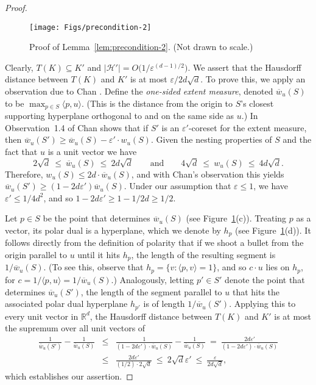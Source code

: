 \documentclass[11pt]{article}   \usepackage[letterpaper,hmargin=2.1cm,vmargin=3cm]{geometry}
\newcommand{\ang}[1]{\langle #1\rangle}
\newcommand{\RE}{\mathbb{R}}    \newcommand{\ZZ}{\mathbb{Z}}    \newcommand{\eps}{\varepsilon}  \newcommand{\ST}{\,:\,}         \newcommand{\sq}{\square}
\newcommand{\inv}[1]{\frac{1}{#1}}
\begin{document}
\begin{proof}
\begin{figure}[htbp]
  \centerline{\texttt{[image: Figs/precondition-2]}}
  \caption{Proof of Lemma~\ref{lem:precondition-2}. (Not drawn to scale.)}
  \label{fig:precondition-2}
\end{figure}


Clearly, $T(K) \subseteq K'$ and $|\mathcal{H'}| = O\big(1/\eps^{(d-1)/2}\big)$. We assert that the Hausdorff distance between $T(K)$ and $K'$ is at most $\eps/2d\sqrt{d}$. To prove this, we apply an observation due to Chan \cite{Chan-coreset}. Define the \emph{one-sided extent measure}, denoted $\overline{w}_u(S)$ to be $\max_{p \in S} \ang{p, u}$. (This is the distance from the origin to $S$'s closest supporting hyperplane orthogonal to and on the same side as $u$.) In Observation~{1.4} of \cite{Chan-coreset} Chan shows that if $S'$ is an $\eps'$-coreset for the extent measure, then $\overline{w}_u(S') \ge \overline{w}_u(S) - \eps' \cdot w_u(S)$. Given the nesting properties of $S$ and the fact that $u$ is a unit vector we have 
\[
	2 \sqrt{d} ~ \le ~ \overline{w}_u(S) ~ \le ~ 2 d \sqrt{d}
		\qquad\mbox{and}\qquad
	4 \sqrt{d} ~ \le ~ w_u(S) ~ \le ~ 4 d \sqrt{d}. 
\]
Therefore, $w_u(S) \le 2 d \cdot \overline{w}_u(S)$, and with Chan's observation this yields $\overline{w}_u(S') \ge (1 - 2 d \eps') \overline{w}_u(S)$. Under our assumption that $\eps \le 1$, we have $\eps' \le 1/4 d^2$, and so $1 - 2 d \eps' \ge 1 - 1/2 d \ge 1/2$.

Let $p \in S$ be the point that determines $\overline{w}_u(S)$ (see Figure~\ref{fig:precondition-2}(c)). Treating $p$ as a vector, its polar dual is a hyperplane, which we denote by $h_p$ (see Figure~\ref{fig:precondition-2}(d)). It follows directly from the definition of polarity that if we shoot a bullet from the origin parallel to $u$ until it hits $h_p$, the length of the resulting segment is $1/\overline{w}_u(S)$. (To see this, observe that $h_p = \{v : \ang{p,v} = 1\}$, and so $c \cdot u$ lies on $h_p$, for $c = 1/\ang{p,u} = 1/\overline{w}_u(S)$.) Analogously, letting $p' \in S'$ denote the point that determines $\overline{w}_u(S')$, the length of the segment parallel to $u$ that hits the associated polar dual hyperplane $h_{p'}$ is of length $1/\overline{w}_u(S')$. Applying this to every unit vector in $\RE^d$, the Hausdorff distance between $T(K)$ and $K'$ is at most the supremum over all unit vectors of 
\begin{eqnarray*}
	\inv{\overline{w}_u(S')} - \inv{\overline{w}_u(S)}
		& \le & \inv{(1 - 2 d \eps') \cdot \overline{w}_u(S)} - \inv{\overline{w}_u(S)}
		~  =  ~ \frac{2 d \eps'}{(1 - 2 d \eps') \cdot \overline{w}_u(S)} \\
		& \le & \frac{2 d \eps'}{(1/2) \cdot 2 \sqrt{d}}
		~ \le ~ 2 \sqrt{d} \eps'
		~ \le ~ \frac{\eps}{2d \sqrt{d}},
\end{eqnarray*}
which establishes our assertion.


\end{proof}
\end{document}
